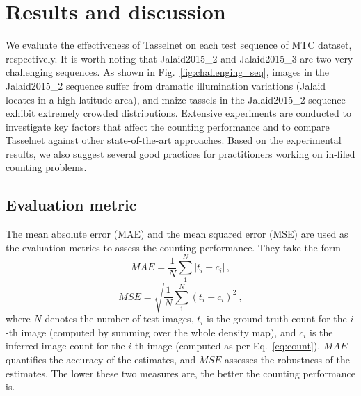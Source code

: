\documentclass[twocolumn]{bmcart}%
\begin{document}
\section*{Results and discussion}
We evaluate the effectiveness of Tasselnet on each test sequence of MTC dataset, respectively. It is worth noting that Jalaid2015\_2 and Jalaid2015\_3 are two very challenging sequences. As shown in Fig.~\ref{fig:challenging_seq}, images in the Jalaid2015\_2 sequence suffer from dramatic illumination variations (Jalaid locates in a high-latitude area), and maize tassels in the Jalaid2015\_2 sequence exhibit extremely crowded distributions. Extensive experiments are conducted to investigate key factors that affect the counting performance and to compare Tasselnet against other state-of-the-art approaches. Based on the experimental results, we also suggest several good practices for practitioners working on in-filed counting problems.

\subsection*{Evaluation metric}
The mean absolute error (MAE) and the mean squared error (MSE) are used as the evaluation metrics to assess the counting performance. They take the form
\begin{equation}
MAE=\frac{1}{N}\sum_1^N|t_i-c_i|\,,
\end{equation}
\begin{equation}
MSE=\sqrt{\frac{1}{N}\sum_1^N(t_i-c_i)^2}\,,
\end{equation}
where $N$ denotes the number of test images, $t_i$ is the ground truth count for the $i$-th image (computed by summing over the whole density map), and $c_i$ is the inferred image count for the $i$-th image (computed as per Eq.~\eqref{eq:count}). $MAE$ quantifies the accuracy of the estimates, and $MSE$ assesses the robustness of the estimates. The lower these two measures are, the better the counting performance is.
\end{document}
